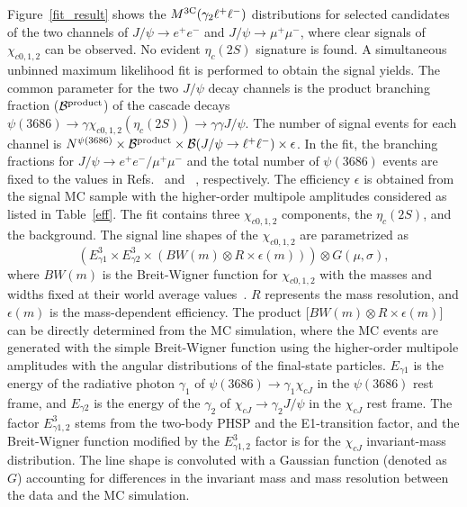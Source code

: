 \documentclass[prd,twocolumn,showpacs,amsmath,amssymb]{revtex4-1}
\begin{document}
Figure~\ref{fit_result} shows the $M^{\rm 3C}(\gamma_{2}\ell^{+}\ell^{-})$ distributions for selected candidates of the two channels
of $J/\psi\rightarrow e^{+}e^{-}$ and $J/\psi\rightarrow\mu^{+}\mu^{-}$, where clear signals of $\chi_{c0,1,2}$ can be observed.
No evident $\eta_{c}(2S)$ signature is found. A simultaneous unbinned maximum likelihood fit is performed to obtain the signal yields.
The common parameter for the two $J/\psi$ decay channels is the product branching fraction ($\mathcal{B^{\rm product}}$) of the cascade decays $\psi(3686)\to\gamma\chi_{c0,1,2}(\eta_c(2S))\to\gamma\gamma J/\psi$. The number of signal events for each channel is $N^{\psi(3686)}\times \mathcal{B^{\rm product}}\times\mathcal{B}(J/\psi\rightarrow \ell^{+}\ell^{-})\times\epsilon$.
In the fit, the branching fractions
for $J/\psi\rightarrow e^{+}e^{-}/\mu^{+}\mu^{-}$ and the total number of $\psi(3686)$ events are fixed to the values in Refs.~\cite{PDG} and ~\cite{psip_N}, respectively. The efficiency $\epsilon$ is obtained from the signal MC sample with the higher-order multipole amplitudes considered as listed in Table~\ref{eff}.
The fit contains three $\chi_{c0,1,2}$ components, the $\eta_{c}(2S)$, and the background.
The signal line shapes of the $\chi_{c0,1,2}$ are parametrized as
%
\begin{equation}\label{chicj_line}
(E_{\gamma 1}^{3}\times E_{\gamma 2}^{3}\times (BW(m)\otimes R\times\epsilon(m)))\otimes G(\mu,\sigma),
\end{equation}
%
\noindent where $BW(m)$ is the Breit-Wigner function for $\chi_{c0,1,2}$ with the masses and widths fixed at their world average values~\cite{PDG}.
$R$ represents the mass resolution, and $\epsilon(m)$ is the mass-dependent efficiency.
The product [$BW(m)\otimes R\times\epsilon(m)$] can be directly determined from the MC simulation, where the MC events are generated with the simple Breit-Wigner function using the higher-order multipole amplitudes with the angular distributions of the final-state particles. $E_{\gamma 1}$ is the energy of the radiative photon
$\gamma_{1}$ of $\psi(3686)\rightarrow\gamma_{1}\chi_{cJ}$ in the $\psi(3686)$ rest frame, and $E_{\gamma 2}$ is the energy of the $\gamma_{2}$ of
$\chi_{cJ}\rightarrow\gamma_{2}J/\psi$ in the $\chi_{cJ}$ rest frame. The factor $E_{\gamma 1,2}^{3}$ stems from the two-body {\sc PHSP} and the
E1-transition factor, and the Breit-Wigner function modified by the $E_{\gamma 1,2}^{3}$ factor is for the $\chi_{cJ}$ invariant-mass distribution. The line shape is convoluted with a Gaussian function (denoted as $G$) accounting for differences in the invariant mass and mass resolution between the data and the MC simulation.
\end{document}
